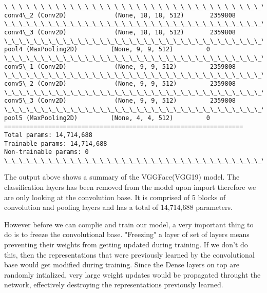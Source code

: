 \documentclass[11pt]{article}
\begin{document}
\begin{Verbatim}[commandchars=\\\{\}]
\_\_\_\_\_\_\_\_\_\_\_\_\_\_\_\_\_\_\_\_\_\_\_\_\_\_\_\_\_\_\_\_\_\_\_\_\_\_\_\_\_\_\_\_\_\_\_\_\_\_\_\_\_\_\_\_\_\_\_\_\_\_\_\_\_
conv4\_2 (Conv2D)             (None, 18, 18, 512)       2359808   
\_\_\_\_\_\_\_\_\_\_\_\_\_\_\_\_\_\_\_\_\_\_\_\_\_\_\_\_\_\_\_\_\_\_\_\_\_\_\_\_\_\_\_\_\_\_\_\_\_\_\_\_\_\_\_\_\_\_\_\_\_\_\_\_\_
conv4\_3 (Conv2D)             (None, 18, 18, 512)       2359808   
\_\_\_\_\_\_\_\_\_\_\_\_\_\_\_\_\_\_\_\_\_\_\_\_\_\_\_\_\_\_\_\_\_\_\_\_\_\_\_\_\_\_\_\_\_\_\_\_\_\_\_\_\_\_\_\_\_\_\_\_\_\_\_\_\_
pool4 (MaxPooling2D)         (None, 9, 9, 512)         0         
\_\_\_\_\_\_\_\_\_\_\_\_\_\_\_\_\_\_\_\_\_\_\_\_\_\_\_\_\_\_\_\_\_\_\_\_\_\_\_\_\_\_\_\_\_\_\_\_\_\_\_\_\_\_\_\_\_\_\_\_\_\_\_\_\_
conv5\_1 (Conv2D)             (None, 9, 9, 512)         2359808   
\_\_\_\_\_\_\_\_\_\_\_\_\_\_\_\_\_\_\_\_\_\_\_\_\_\_\_\_\_\_\_\_\_\_\_\_\_\_\_\_\_\_\_\_\_\_\_\_\_\_\_\_\_\_\_\_\_\_\_\_\_\_\_\_\_
conv5\_2 (Conv2D)             (None, 9, 9, 512)         2359808   
\_\_\_\_\_\_\_\_\_\_\_\_\_\_\_\_\_\_\_\_\_\_\_\_\_\_\_\_\_\_\_\_\_\_\_\_\_\_\_\_\_\_\_\_\_\_\_\_\_\_\_\_\_\_\_\_\_\_\_\_\_\_\_\_\_
conv5\_3 (Conv2D)             (None, 9, 9, 512)         2359808   
\_\_\_\_\_\_\_\_\_\_\_\_\_\_\_\_\_\_\_\_\_\_\_\_\_\_\_\_\_\_\_\_\_\_\_\_\_\_\_\_\_\_\_\_\_\_\_\_\_\_\_\_\_\_\_\_\_\_\_\_\_\_\_\_\_
pool5 (MaxPooling2D)         (None, 4, 4, 512)         0         
=================================================================
Total params: 14,714,688
Trainable params: 14,714,688
Non-trainable params: 0
\_\_\_\_\_\_\_\_\_\_\_\_\_\_\_\_\_\_\_\_\_\_\_\_\_\_\_\_\_\_\_\_\_\_\_\_\_\_\_\_\_\_\_\_\_\_\_\_\_\_\_\_\_\_\_\_\_\_\_\_\_\_\_\_\_

    \end{Verbatim}

    The output above shows a summary of the VGGFace(VGG19) model. The
classification layers has been removed from the model upon import
therefore we are only looking at the convolution base. It is comprised
of 5 blocks of convolution and pooling layers and has a total of
14,714,688 parameters.

However before we can complie and train our model, a very important
thing to do is to freeze the convolutional base. "Freezing" a layer of
set of layers means preventing their weights from getting updated during
training. If we don't do this, then the representations that were
previously learned by the convolutional base would get modified during
training. Since the Dense layers on top are randomly intialized, very
large weight updates would be propagated throught the network,
effectively destroying the representations previously learned.
\end{document}
